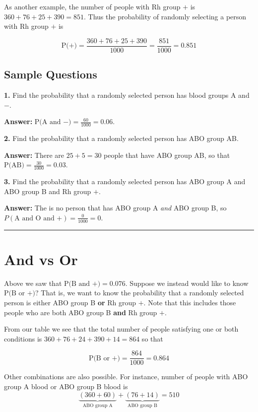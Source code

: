 \documentclass[
]{book}
\begin{document}
As another example, the number of people with
Rh group \(+\) is \(360 + 76 + 25 + 390 = 851\). Thus the probability of randomly selecting
a person with Rh group \(+\) is

\[
\mbox{P(+)} = \frac{360 + 76 + 25 + 390}{1000} = \frac{851}{1000} = 0.851
\]

\hypertarget{sample-questions-2}{%
\subsection{Sample Questions}\label{sample-questions-2}}

\textbf{1.} Find the probability that a randomly selected person has blood
groups A and \(-\).

\textbf{Answer:} \(\text{P(A and }-) = \frac{60}{1000} = 0.06\).

\textbf{2.} Find the probability that a randomly selected person has ABO group AB.

\textbf{Answer:} There are \(25 + 5 = 30\) people that have ABO group AB, so that
\(\mbox{P(AB)} = \frac{30}{1000} = 0.03\).

\textbf{3.} Find the probability that a randomly selected person has ABO group A and
ABO group B and Rh group \(+\).

\textbf{Answer:} The is no person that has ABO group A \emph{and} ABO group B, so
\(P(\text{A and O and +}) = \frac{0}{1000} = 0\).

\begin{center}\rule{0.5\linewidth}{0.5pt}\end{center}

\hypertarget{and-vs-or}{%
\section{And vs Or}\label{and-vs-or}}

Above we saw that \(\text{P(B and }+) = 0.076\). Suppose we instead would like
to know \(\text{P(B or }+)\)?
That is, we want to know the probability that a randomly selected person
is either ABO group B \textbf{or} Rh group \(+\).
Note that this includes those people who are both ABO group B \textbf{and} Rh group \(+\).

From our table we see that the total number of people satisfying one or both
conditions is \(360 + 76 + 24 + 390 + 14 = 864\) so that

\[
\text{P(B or +)} = \frac{864}{1000} = 0.864
\]

Other combinations are also possible.
For instance, number of people with ABO group A blood or ABO group B blood
is
\[
\underbrace{(360 + 60)}_\text{ABO group A} + \underbrace{(76 + 14)}_\text{ABO group B} = 510
\]
\end{document}
